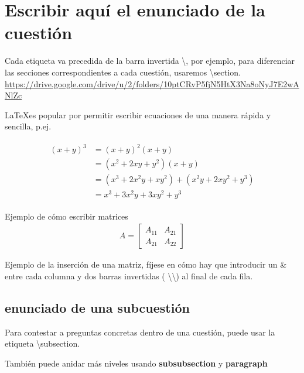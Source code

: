 \newpage


\section{Escribir aquí el enunciado de la cuestión}

Cada etiqueta va precedida de la barra invertida \textbackslash , por ejemplo, para diferenciar las secciones correspondientes a cada cuestión, usaremos \textbackslash section. 
\url{https://drive.google.com/drive/u/2/folders/10ptCRvP5fjN5HtX3Na8oNyJ7E2wANlZc}

\LaTeX es popular por permitir escribir ecuaciones de una manera rápida y sencilla, p.ej.

\begin{align} 
	\begin{split}
		(x+y)^3 	&= (x+y)^2(x+y)\\
		&=(x^2+2xy+y^2)(x+y)\\
		&=(x^3+2x^2y+xy^2) + (x^2y+2xy^2+y^3)\\
		&=x^3+3x^2y+3xy^2+y^3
	\end{split}					
\end{align}

Ejemplo de cómo escribir matrices
\begin{align}
	A = 
	\begin{bmatrix}
		A_{11} & A_{21} \\
		A_{21} & A_{22}
	\end{bmatrix}
\end{align}

Ejemplo de la inserción de una matriz, fíjese en cómo hay que introducir un \& entre cada columna y dos barras invertidas ( \textbackslash\textbackslash ) al final de cada fila.



\subsection{enunciado de una subcuestión}

Para contestar a preguntas concretas dentro de una cuestión, puede usar la etiqueta \textbackslash subsection.

También puede anidar más niveles usando \textbf{subsubsection} y \textbf{paragraph}



